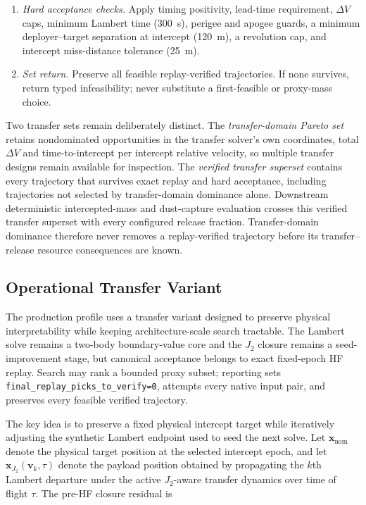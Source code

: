 \begin{enumerate}[leftmargin=*]
        \item \emph{Hard acceptance checks.} Apply timing positivity, lead-time requirement, \(\Delta V\) caps, minimum Lambert time (\SI{300}{\second}), perigee and apogee guards, a minimum deployer--target separation at intercept (\SI{120}{\metre}), a revolution cap, and intercept miss-distance tolerance (\SI{25}{\metre}).
        \item \emph{Set return.} Preserve all feasible replay-verified trajectories. If none survives, return typed infeasibility; never substitute a first-feasible or proxy-mass choice.
    \end{enumerate}

    Two transfer sets remain deliberately distinct. The \emph{transfer-domain Pareto set} retains nondominated opportunities in the transfer solver's own coordinates, total \(\Delta V\) and time-to-intercept per intercept relative velocity, so multiple transfer designs remain available for inspection. The \emph{verified transfer superset} contains every trajectory that survives exact replay and hard acceptance, including trajectories not selected by transfer-domain dominance alone. Downstream deterministic intercepted-mass and dust-capture evaluation crosses this verified transfer superset with every configured release fraction. Transfer-domain dominance therefore never removes a replay-verified trajectory before its transfer--release resource consequences are known.

    \subsection{Operational Transfer Variant}
    The production profile uses a transfer variant designed to preserve physical interpretability while keeping architecture-scale search tractable. The Lambert solve remains a two-body boundary-value core and the \(J_2\) closure remains a seed-improvement stage, but canonical acceptance belongs to exact fixed-epoch HF replay. Search may rank a bounded proxy subset; reporting sets \texttt{final\_replay\_picks\_to\_verify=0}, attempts every native input pair, and preserves every feasible verified trajectory.

   The key idea is to preserve a fixed physical intercept target while iteratively adjusting the synthetic Lambert endpoint used to seed the next solve. Let \( \mathbf{x}_{\mathrm{nom}} \) denote the physical target position at the selected intercept epoch, and let \( \mathbf{x}_{J_2}(\mathbf{v}_k,\tau) \) denote the payload position obtained by propagating the \(k\)th Lambert departure under the active \(J_2\)-aware transfer dynamics over time of flight \(\tau\). The pre-HF closure residual is

